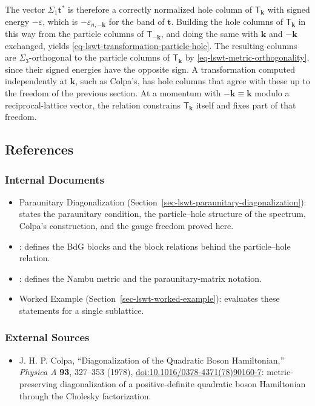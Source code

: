 The vector \(\Sigma_1\mathbf t^*\) is therefore a correctly normalized hole column of \(\mathsf T_{\mathbf k}\) with signed energy \(-\varepsilon\), which is \(-\varepsilon_{n,-\mathbf k}\) for the band of \(\mathbf t\). Building the hole columns of \(\mathsf T_{\mathbf k}\) in this way from the particle columns of \(\mathsf T_{-\mathbf k}\), and doing the same with \(\mathbf k\) and \(-\mathbf k\) exchanged, yields \eqref{eq-lswt-transformation-particle-hole}. The resulting columns are \(\Sigma_3\)-orthogonal to the particle columns of \(\mathsf T_{\mathbf k}\) by \eqref{eq-lswt-metric-orthogonality}, since their signed energies have the opposite sign. A transformation computed independently at \(\mathbf k\), such as Colpa's, has hole columns that agree with these up to the freedom of the previous section. At a momentum with \(-\mathbf k\equiv\mathbf k\) modulo a reciprocal-lattice vector, the relation constrains \(\mathsf T_{\mathbf k}\) itself and fixes part of that freedom.

\subsection{References}

\subsubsection{Internal Documents}

\begin{itemize}
\tightlist
\item
  Paraunitary Diagonalization (Section~\ref{sec-lswt-paraunitary-diagonalization}): states the paraunitary condition, the particle--hole structure of the spectrum, Colpa's construction, and the gauge freedom proved here.
\item
  : defines the BdG blocks and the block relations behind the particle--hole relation.
\item
  : defines the Nambu metric and the paraunitary-matrix notation.
\item
  Worked Example (Section~\ref{sec-lswt-worked-example}): evaluates these statements for a single sublattice.
\end{itemize}

\subsubsection{External Sources}

\begin{itemize}
\tightlist
\item
  J. H. P. Colpa, ``Diagonalization of the Quadratic Boson Hamiltonian,'' \emph{Physica A} \textbf{93}, 327--353 (1978), \href{https://doi.org/10.1016/0378-4371(78)90160-7}{doi:10.1016/0378-4371(78)90160-7}: metric-preserving diagonalization of a positive-definite quadratic boson Hamiltonian through the Cholesky factorization.
\end{itemize}
